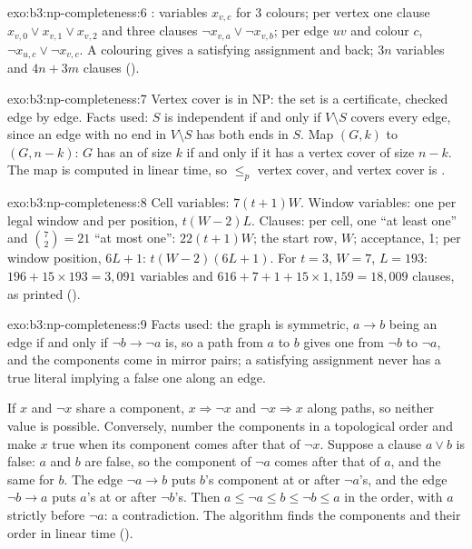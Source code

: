 \begin{solution}{exo:b3:np-completeness:6}
: variables $x_{v,c}$ for 3 colours; per vertex one clause $x_{v,0} \vee x_{v,1} \vee x_{v,2}$ and three clauses $\neg x_{v,a} \vee \neg x_{v,b}$; per edge $uv$ and colour $c$, $\neg x_{u,c} \vee \neg x_{v,c}$. A colouring gives a satisfying assignment and back; $3n$ variables and $4n + 3m$ clauses ().
\end{solution}

\begin{solution}{exo:b3:np-completeness:7}
Vertex cover is in NP: the set is a certificate, checked edge by edge. Facts used: $S$ is independent if and only if $V \setminus S$ covers every edge, since an edge with no end in $V \setminus S$ has both ends in $S$. Map $(G, k)$ to $(G, n - k)$: $G$ has an  of size $k$ if and only if it has a vertex cover of size $n - k$. The map is computed in linear time, so  $\le_p$ vertex cover, and vertex cover is .
\end{solution}

\begin{solution}{exo:b3:np-completeness:8}
Cell variables: $7(t + 1)W$. Window variables: one per legal window and per position, $t(W - 2)L$. Clauses: per cell, one ``at least one'' and $\binom{7}{2} = 21$ ``at most one'': $22(t + 1)W$; the start row, $W$; acceptance, 1; per window position, $6L + 1$: $t(W - 2)(6L + 1)$. For $t = 3$, $W = 7$, $L = 193$: $196 + 15 \times 193 = 3{,}091$ variables and $616 + 7 + 1 + 15 \times 1{,}159 = 18{,}009$ clauses, as printed ().
\end{solution}

\begin{solution}{exo:b3:np-completeness:9}
Facts used: the graph is symmetric, $a \to b$ being an edge if and only if $\neg b \to \neg a$ is, so a path from $a$ to $b$ gives one from $\neg b$ to $\neg a$, and the components come in mirror pairs; a satisfying assignment never has a true literal implying a false one along an edge.

If $x$ and $\neg x$ share a component, $x \Rightarrow \neg x$ and $\neg x \Rightarrow x$ along paths, so neither value is possible. Conversely, number the components in a topological order and make $x$ true when its component comes after that of $\neg x$. Suppose a clause $a \vee b$ is false: $a$ and $b$ are false, so the component of $\neg a$ comes after that of $a$, and the same for $b$. The edge $\neg a \to b$ puts $b$'s component at or after $\neg a$'s, and the edge $\neg b \to a$ puts $a$'s at or after $\neg b$'s. Then $a \le \neg a \le b \le \neg b \le a$ in the order, with $a$ strictly before $\neg a$: a contradiction. The algorithm finds the components and their order in linear time ().
\end{solution}

